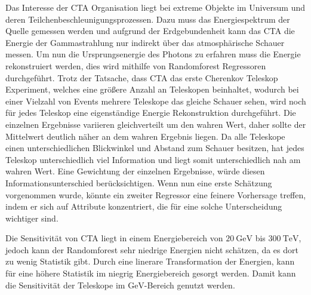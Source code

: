 Das Interesse der CTA Organisation liegt bei extreme Objekte im Universum und deren Teilchenbeschleunigungsprozessen.
Dazu muss das Energiespektrum der Quelle gemessen werden und aufgrund der Erdgebundenheit kann das CTA die Energie der Gammastrahlung nur indirekt über
das atmosphärische Schauer messen.
Um nun die Ursprungsenergie des Photons zu erfahren muss die Energie rekonstruiert werden, dies wird mithilfe von Randomforest Regressoren durchgeführt.
Trotz der Tatsache, dass CTA das erste Cherenkov Teleskop Experiment, welches eine größere Anzahl an Teleskopen beinhaltet, wodurch bei einer Vielzahl von Events mehrere
Teleskope das gleiche Schauer sehen, wird noch für jedes Teleskop eine eigenständige Energie Rekonstruktion durchgeführt. Die einzelnen Ergebnisse variieren gleichverteilt
um den wahren Wert, daher sollte der Mittelwert deutlich näher an dem wahren Ergebnis liegen.
Da alle Teleskope einen unterschiedlichen Blickwinkel und Abstand zum Schauer besitzen, hat jedes Teleskop unterschiedlich viel Information und liegt somit
unterschiedlich nah am wahren Wert.
Eine Gewichtung der einzelnen Ergebnisse, würde diesen Informationsunterschied berücksichtigen.
Wenn nun eine erste Schätzung vorgenommen wurde, könnte ein zweiter Regressor eine feinere Vorhersage treffen, indem er sich auf Attribute konzentriert, die
für eine solche Unterscheidung wichtiger sind.

Die Sensitivität von CTA liegt in einem Energiebereich von $\SI{20}{\giga\eV}$ bis $\SI{300}{\tera\eV}$\cite{CTAscience}, jedoch kann der Randomforest
sehr niedrige Energien nicht schätzen, da es dort zu wenig Statistik gibt.
Durch eine linerare Transformation der Energien, kann für eine höhere Statistik im niegrig Energiebereich gesorgt werden.
Damit kann die Sensitivität der Teleskope im $\si{\giga\eV}$-Bereich genutzt werden.
